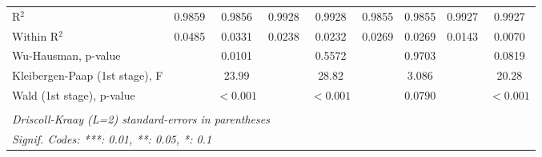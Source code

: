 \documentclass[a4paper]{article}
\begin{document}
\begin{table}[h!]
{\begin{tabular}{lcccccccc}
      R$^2$                               & 0.9859         & 0.9856                & 0.9928         & 0.9928                & 0.9855         & 0.9855        & 0.9927         & 0.9927\\  
      Within R$^2$                        & 0.0485         & 0.0331                & 0.0238         & 0.0232                & 0.0269         & 0.0269        & 0.0143         & 0.0070\\  
      Wu-Hausman, p-value                 &                & 0.0101                &                & 0.5572                &                & 0.9703        &                & 0.0819\\  
      Kleibergen-Paap (1st stage), F &           & 23.99                 &                & 28.82                 &                & 3.086         &                & 20.28\\  
      Wald (1st stage), p-value   &                & $<0.001$              &                & $<0.001$              &                & 0.0790               &   & $<0.001$             \\  
      \bottomrule \\ [-0.9em]
      \multicolumn{9}{l}{\emph{Driscoll-Kraay (L=2) standard-errors in parentheses}}\\
      \multicolumn{9}{l}{\emph{Signif. Codes: ***: 0.01, **: 0.05, *: 0.1}}\\
   \end{tabular}
   }
\end{table}
\FloatBarrier
\end{document}
